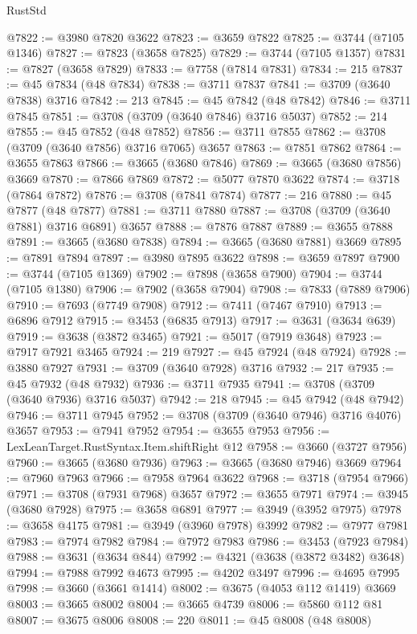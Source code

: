 \begin{lexlean}{RustStd}
\begin{coremodule}
@7822 := @3980 @7820 @3622
@7823 := @3659 @7822
@7825 := @3744 (@7105 @1346)
@7827 := @7823 (@3658 @7825)
@7829 := @3744 (@7105 @1357)
@7831 := @7827 (@3658 @7829)
@7833 := @7758 (@7814 @7831)
@7834 := 215
@7837 := @45 @7834 (@48 @7834)
@7838 := @3711 @7837
@7841 := @3709 (@3640 @7838) @3716
@7842 := 213
@7845 := @45 @7842 (@48 @7842)
@7846 := @3711 @7845
@7851 := @3708 (@3709 (@3640 @7846) @3716 @5037)
@7852 := 214
@7855 := @45 @7852 (@48 @7852)
@7856 := @3711 @7855
@7862 := @3708 (@3709 (@3640 @7856) @3716 @7065) @3657
@7863 := @7851 @7862
@7864 := @3655 @7863
@7866 := @3665 (@3680 @7846)
@7869 := @3665 (@3680 @7856) @3669
@7870 := @7866 @7869
@7872 := @5077 @7870 @3622
@7874 := @3718 (@7864 @7872)
@7876 := @3708 (@7841 @7874)
@7877 := 216
@7880 := @45 @7877 (@48 @7877)
@7881 := @3711 @7880
@7887 := @3708 (@3709 (@3640 @7881) @3716 @6891) @3657
@7888 := @7876 @7887
@7889 := @3655 @7888
@7891 := @3665 (@3680 @7838)
@7894 := @3665 (@3680 @7881) @3669
@7895 := @7891 @7894
@7897 := @3980 @7895 @3622
@7898 := @3659 @7897
@7900 := @3744 (@7105 @1369)
@7902 := @7898 (@3658 @7900)
@7904 := @3744 (@7105 @1380)
@7906 := @7902 (@3658 @7904)
@7908 := @7833 (@7889 @7906)
@7910 := @7693 (@7749 @7908)
@7912 := @7411 (@7467 @7910)
@7913 := @6896 @7912
@7915 := @3453 (@6835 @7913)
@7917 := @3631 (@3634 @639)
@7919 := @3638 (@3872 @3465)
@7921 := @5017 (@7919 @3648)
@7923 := @7917 @7921 @3465
@7924 := 219
@7927 := @45 @7924 (@48 @7924)
@7928 := @3880 @7927
@7931 := @3709 (@3640 @7928) @3716
@7932 := 217
@7935 := @45 @7932 (@48 @7932)
@7936 := @3711 @7935
@7941 := @3708 (@3709 (@3640 @7936) @3716 @5037)
@7942 := 218
@7945 := @45 @7942 (@48 @7942)
@7946 := @3711 @7945
@7952 := @3708 (@3709 (@3640 @7946) @3716 @4076) @3657
@7953 := @7941 @7952
@7954 := @3655 @7953
@7956 := LexLeanTarget.RustSyntax.Item.shiftRight @12
@7958 := @3660 (@3727 @7956)
@7960 := @3665 (@3680 @7936)
@7963 := @3665 (@3680 @7946) @3669
@7964 := @7960 @7963
@7966 := @7958 @7964 @3622
@7968 := @3718 (@7954 @7966)
@7971 := @3708 (@7931 @7968) @3657
@7972 := @3655 @7971
@7974 := @3945 (@3680 @7928)
@7975 := @3658 @6891
@7977 := @3949 (@3952 @7975)
@7978 := @3658 @4175
@7981 := @3949 (@3960 @7978) @3992
@7982 := @7977 @7981
@7983 := @7974 @7982
@7984 := @7972 @7983
@7986 := @3453 (@7923 @7984)
@7988 := @3631 (@3634 @844)
@7992 := @4321 (@3638 (@3872 @3482) @3648)
@7994 := @7988 @7992 @4673
@7995 := @4202 @3497
@7996 := @4695 @7995
@7998 := @3660 (@3661 @1414)
@8002 := @3675 (@4053 @112 @1419) @3669
@8003 := @3665 @8002
@8004 := @3665 @4739
@8006 := @5860 @112 @81
@8007 := @3675 @8006
@8008 := 220
@8011 := @45 @8008 (@48 @8008)

\end{coremodule}
\end{lexlean}
